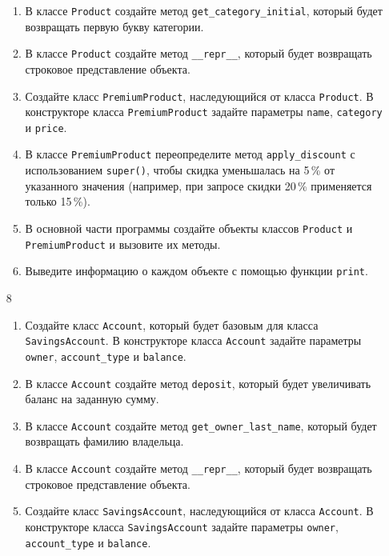 \begin{enumerate}
\begin{enumerate}
    \item В классе \texttt{Product} создайте метод \texttt{get\_category\_initial}, который будет возвращать первую букву категории.
    
    \item В классе \texttt{Product} создайте метод \texttt{\_\_repr\_\_}, который будет возвращать строковое представление объекта.
    
    \item Создайте класс \texttt{PremiumProduct}, наследующийся от класса \texttt{Product}. В конструкторе класса \texttt{PremiumProduct} задайте параметры \texttt{name}, \texttt{category} и \texttt{price}.
    
    \item В классе \texttt{PremiumProduct} переопределите метод \texttt{apply\_discount} с использованием \texttt{super()}, чтобы скидка уменьшалась на 5\,\% от указанного значения (например, при запросе скидки 20\,\% применяется только 15\,\%).
    
    \item В основной части программы создайте объекты классов \texttt{Product} и \texttt{PremiumProduct} и вызовите их методы.
    
    \item Выведите информацию о каждом объекте с помощью функции \texttt{print}.
\end{enumerate}

\item[8] 
\begin{enumerate}
    \item Создайте класс \texttt{Account}, который будет базовым для класса \texttt{SavingsAccount}. В конструкторе класса \texttt{Account} задайте параметры \texttt{owner}, \texttt{account\_type} и \texttt{balance}.
    
    \item В классе \texttt{Account} создайте метод \texttt{deposit}, который будет увеличивать баланс на заданную сумму.
    
    \item В классе \texttt{Account} создайте метод \texttt{get\_owner\_last\_name}, который будет возвращать фамилию владельца.
    
    \item В классе \texttt{Account} создайте метод \texttt{\_\_repr\_\_}, который будет возвращать строковое представление объекта.
    
    \item Создайте класс \texttt{SavingsAccount}, наследующийся от класса \texttt{Account}. В конструкторе класса \texttt{SavingsAccount} задайте параметры \texttt{owner}, \texttt{account\_type} и \texttt{balance}.
    

\end{enumerate}
\end{enumerate}
